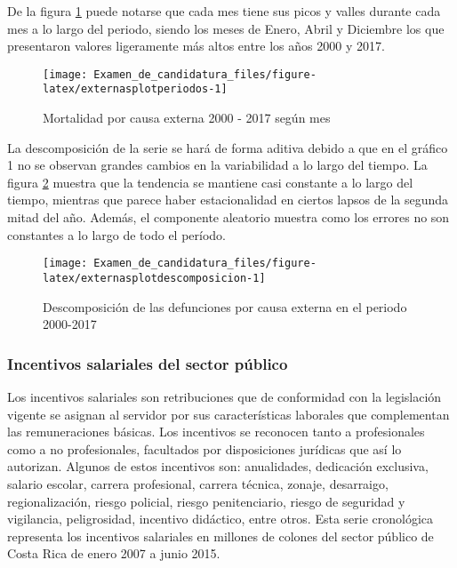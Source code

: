 \documentclass[
]{article}
\begin{document}
De la figura \ref{fig:externasplotperiodos} puede notarse que cada mes
tiene sus picos y valles durante cada mes a lo largo del periodo, siendo
los meses de Enero, Abril y Diciembre los que presentaron valores
ligeramente más altos entre los años 2000 y 2017.

\begin{figure}[H]
\texttt{[image: Examen\_de\_candidatura\_files/figure-latex/externasplotperiodos-1]} \caption{Mortalidad por causa externa 2000 - 2017 según mes}\label{fig:externasplotperiodos}
\end{figure}

La descomposición de la serie se hará de forma aditiva debido a que en
el gráfico 1 no se observan grandes cambios en la variabilidad a lo
largo del tiempo. La figura \ref{fig:externasplotdescomposicion} muestra
que la tendencia se mantiene casi constante a lo largo del tiempo,
mientras que parece haber estacionalidad en ciertos lapsos de la segunda
mitad del año. Además, el componente aleatorio muestra como los errores
no son constantes a lo largo de todo el período.

\begin{figure}[H]
\texttt{[image: Examen\_de\_candidatura\_files/figure-latex/externasplotdescomposicion-1]} \caption{Descomposición de las defunciones por causa externa en el periodo 2000-2017}\label{fig:externasplotdescomposicion}
\end{figure}

\subsubsection{Incentivos salariales del sector público}

Los incentivos salariales son retribuciones que de conformidad con la
legislación vigente se asignan al servidor por sus características
laborales que complementan las remuneraciones básicas. Los incentivos se
reconocen tanto a profesionales como a no profesionales, facultados por
disposiciones jurídicas que así lo autorizan. Algunos de estos
incentivos son: anualidades, dedicación exclusiva, salario escolar,
carrera profesional, carrera técnica, zonaje, desarraigo,
regionalización, riesgo policial, riesgo penitenciario, riesgo de
seguridad y vigilancia, peligrosidad, incentivo didáctico, entre otros.
Esta serie cronológica representa los incentivos salariales en millones
de colones del sector público de Costa Rica de enero 2007 a junio 2015.
\end{document}
